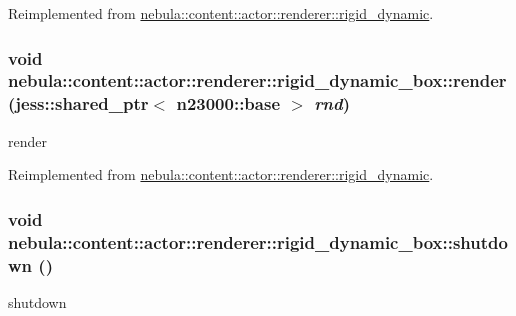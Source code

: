 Reimplemented from \hyperlink{classnebula_1_1content_1_1actor_1_1renderer_1_1rigid__dynamic_ae90eb12e9f68833bd1bf0b8360332f49}{nebula::content::actor::renderer::rigid\_\-dynamic}.\hypertarget{classnebula_1_1content_1_1actor_1_1renderer_1_1rigid__dynamic__box_af1ee2316e0a03674fbbaea64cf1c4a8b}{
\subsubsection[{render}]{\setlength{\rightskip}{0pt plus 5cm}void nebula::content::actor::renderer::rigid\_\-dynamic\_\-box::render (jess::shared\_\-ptr$<$ {\bf n23000::base} $>$ {\em rnd})}}
\label{classnebula_1_1content_1_1actor_1_1renderer_1_1rigid__dynamic__box_af1ee2316e0a03674fbbaea64cf1c4a8b}


render 

Reimplemented from \hyperlink{classnebula_1_1content_1_1actor_1_1renderer_1_1rigid__dynamic_a80f2984c2dadef15360b53cf3d05286c}{nebula::content::actor::renderer::rigid\_\-dynamic}.\hypertarget{classnebula_1_1content_1_1actor_1_1renderer_1_1rigid__dynamic__box_a45f52d77d1f89e86d5ac3cd2d0beb4c0}{
\subsubsection[{shutdown}]{\setlength{\rightskip}{0pt plus 5cm}void nebula::content::actor::renderer::rigid\_\-dynamic\_\-box::shutdown ()}}
\label{classnebula_1_1content_1_1actor_1_1renderer_1_1rigid__dynamic__box_a45f52d77d1f89e86d5ac3cd2d0beb4c0}


shutdown 

